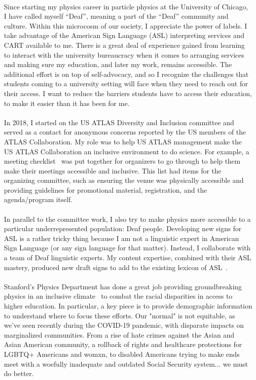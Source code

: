 \documentclass[10pt,a4paper,sans]{moderncv} %
\begin{document}
\\
Since starting my physics career in particle physics at the University of Chicago, I have called myself ``Deaf'', meaning a part of the ``Deaf'' community and culture. Within this microcosm of our society, I appreciate the power of labels. I take advantage of the American Sign Language (ASL) interpreting services and CART available to me. There is a great deal of experience gained from learning to interact with the university bureaucracy when it comes to arranging services and making sure my education, and later my work, remains accessible. The additional effort is on top of self-advocacy, and so I recognize the challenges that students coming to a university setting will face when they need to reach out for their access. I want to reduce the barriers students have to access their education, to make it easier than it has been for me.
\\
\\
In 2018, I started on the US ATLAS Diversity and Inclusion committee and served as a contact for anonymous concerns reported by the US members of the ATLAS Collaboration. My role was to help US ATLAS management make the US ATLAS Collaboration an inclusive environment to do science. For example, a meeting checklist~\cite{Assamagan:2022oka} was put together for organizers to go through to help them make their meetings accessible and inclusive. This list had items for the organizing committee, such as ensuring the venue was physically accessible and providing guidelines for promotional material, registration, and the agenda/program itself.
\\
\\
In parallel to the committee work, I also try to make physics more accessible to a particular underrepresented population: Deaf people. Developing new signs for ASL is a rather tricky thing because I am not a linguistic expert in American Sign Language (or any sign language for that matter). Instead, I collaborate with a team of Deaf linguistic experts. My content expertise, combined with their ASL mastery, produced new draft signs to add to the existing lexicon of ASL~\cite{ICPS2021, MatterInterpretation}.
\\
\\
Stanford's Physics Department has done a great job providing groundbreaking physics in an inclusive climate~\cite{diversitypage} to combat the racial disparities in access to higher education. In particular, a key piece is to provide demographic information to understand where to focus these efforts. Our "normal" is not equitable, as we've seen recently during the COVID-19 pandemic, with disparate impacts on marginalized communities. From a rise of hate crimes against the Asian and Asian American community, a rollback of rights and healthcare protections for LGBTQ+ Americans and womxn, to disabled Americans trying to make ends meet with a woefully inadequate and outdated Social Security system... we must do better.
\end{document}
